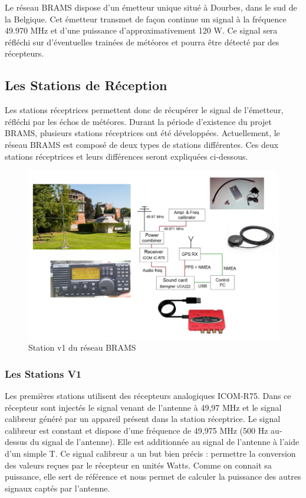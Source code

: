 \documentclass[11pt]{article}
\begin{document}
Le réseau BRAMS dispose d'un émetteur unique situé à Dourbes, dans le sud de la Belgique.
Cet émetteur transmet de façon continue un signal à la fréquence 49.970 MHz et d'une puissance d'approximativement 120 W.
Ce signal sera réfléchi sur d'éventuelles trainées de météores et pourra être détecté par des récepteurs.

\subsection{Les Stations de Réception}

Les stations réceptrices permettent donc de récupérer le signal de l'émetteur, réfléchi par les échos de météores.
Durant la période d'existence du projet BRAMS, plusieurs stations réceptrices ont été développées.
Actuellement, le réseau BRAMS est composé de deux types de stations différentes.
Ces deux stations réceptrices et leurs différences seront expliquées ci-dessous.

\begin{figure}[h]
    \begin{center}
        \includegraphics[scale=0.6]{Material_BRAMS_1.0.png}
        \caption{Station v1 du réseau BRAMS}
        \label{fig:station_icom}
    \end{center}
\end{figure}

\subsubsection{Les Stations V1}

Les premières stations utilisent des récepteurs analogiques ICOM-R75.
Dans ce récepteur sont injectés le signal venant de l'antenne à 49,97 MHz et le signal calibreur généré par un appareil présent dans la station réceptrice.
Le signal calibreur est constant et dispose d'une fréquence de 49,975 MHz (500 Hz au-dessus du signal de l'antenne).
Elle est additionnée au signal de l'antenne à l'aide d'un simple T.
Ce signal calibreur a un but bien précis : permettre la conversion des valeurs reçues par le récepteur en unités Watts.
Comme on connait sa puissance, elle sert de référence et nous permet de calculer la puissance des autres signaux captés par l'antenne.
\end{document}
